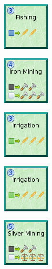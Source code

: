 \documentclass{article}
\begin{document}
\begin{figure}
  \begin{subfigure}{}
    \includegraphics[scale=1]{../rules/png/doe_tech_fishing.png}
  \end{subfigure}
  \begin{subfigure}{}
    \includegraphics[scale=1]{../rules/png/doe_tech_iron_mining.png}
  \end{subfigure}
  \begin{subfigure}{}
    \includegraphics[scale=1]{../rules/png/doe_tech_irrigation.png}
  \end{subfigure}
  \begin{subfigure}{}
    \includegraphics[scale=1]{../rules/png/doe_tech_irrigation.png}
  \end{subfigure}
  \begin{subfigure}{}
    \includegraphics[scale=1]{../rules/png/doe_tech_silver_mining.png}
  \end{subfigure}
\end{figure}
\end{document}
